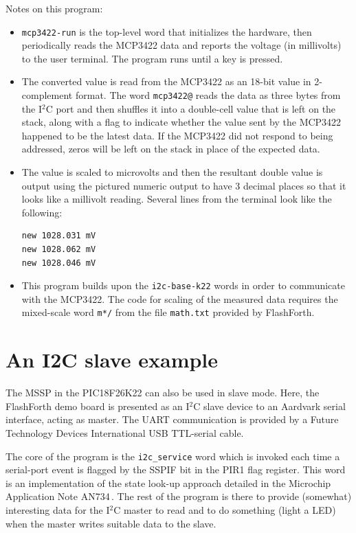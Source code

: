 \documentclass[12pt,a4paper]{article}
\begin{document}
\medskip
\noindent
Notes on this program:
\begin{itemize}
  \item \verb!mcp3422-run! is the top-level word that initializes the hardware, then periodically
    reads the MCP3422 data and reports the voltage (in millivolts) to the user terminal.
    The program runs until a key is pressed.
  \item The converted value is read from the MCP3422 as an 18-bit value in 2-complement format.
    The word \verb!mcp3422@! reads the data as three bytes from the I$^2$C port and then 
    shuffles it into a double-cell value that is left on the stack, along with a flag to indicate
    whether the value sent by the MCP3422 happened to be the latest data.
    If the MCP3422 did not respond to being addressed, zeros will be left on the stack in place
    of the expected data.
  \item The value is scaled to microvolts and then the resultant double value is output using the
    pictured numeric output to have 3 decimal places so that it looks like a millivolt reading.
    Several lines from the terminal look like the following:
    \begin{verbatim}
new 1028.031 mV 
new 1028.062 mV 
new 1028.046 mV 
    \end{verbatim}
  \item This program builds upon the \verb!i2c-base-k22! words
    in order to communicate with the MCP3422. 
    The code for scaling of the measured data requires 
    the mixed-scale word \verb!m*/! from the file \verb!math.txt! provided by FlashForth.
\end{itemize}


\newpage
\section{An I2C slave example}
%
The MSSP in the PIC18F26K22 can also be used in slave mode.
Here, the FlashForth demo board is presented as an I$^2$C slave device to
an Aardvark serial interface, acting as master.
The UART communication is provided by a Future Technology Devices International
USB TTL-serial cable.


\medskip\noindent
The core of the program is the \texttt{i2c\_service} word which is invoked
each time a serial-port event is flagged by the SSPIF bit in the PIR1 flag register.
This word is an implementation of the state look-up approach detailed in 
the Microchip Application Note AN734\,\cite{bowling_raj_2008a}.
The rest of the program is there to provide (somewhat) interesting data 
for the I$^2$C master to read and to do something (light a LED)
when the master writes suitable data to the slave.
\end{document}
